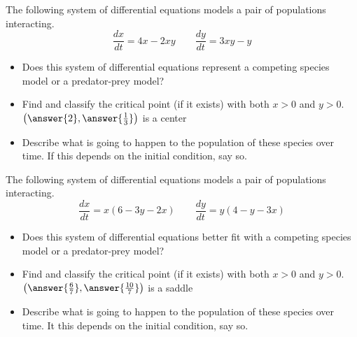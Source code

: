 \documentclass{ximera}
\begin{document}
\begin{exercise}
    The following system of differential equations models a pair of populations interacting. 
    \[ 
        \frac{dx}{dt} = 4x - 2xy \qquad \frac{dy}{dt} = 3xy - y 
    \]
    \begin{itemize}
        \item Does this system of differential equations represent a competing species model or a predator-prey model? 
            \begin{multipleChoice}
            \end{multipleChoice}
        \item Find and classify the critical point (if it exists) with both $x>0$ and $y>0$. $\left(\answer{2}, \answer{\frac{1}{3}}\right)$ is a center
        \item Describe what is going to happen to the population of these species over time. If this depends on the initial condition, say so.
    \end{itemize}
\end{exercise}

\begin{exercise}
    The following system of differential equations models a pair of populations interacting. 
    \[ 
        \frac{dx}{dt} = x(6 - 3y - 2x)  \qquad \frac{dy}{dt} = y(4 - y - 3x) 
    \]
    \begin{itemize}
        \item Does this system of differential equations better fit with a competing species model or a predator-prey model? %
            \begin{multipleChoice}
            \end{multipleChoice}
        \item Find and classify the critical point (if it exists) with both $x>0$ and $y>0$. $\left(\answer{\frac{6}{7}}, \answer{\frac{10}{7}}\right)$ is a saddle
        \item Describe what is going to happen to the population of these species over time. It this depends on the initial condition, say so.
    \end{itemize}
\end{exercise}
\end{document}
